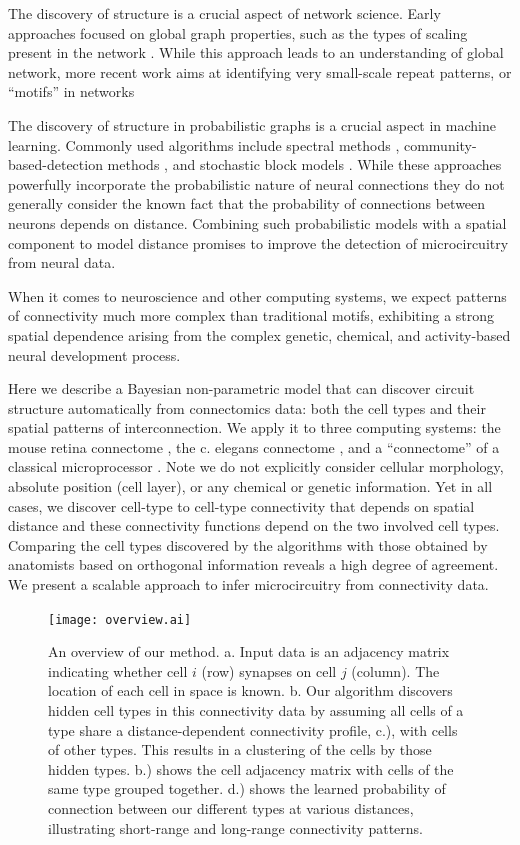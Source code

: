 \documentclass{article}
\begin{document}
The discovery of structure is a crucial aspect of network
science. Early approaches focused on global graph properties, such as
the types of scaling present in the network \autocite
{WattsStrogatz1998} .  While this approach leads to an understanding
of global network, more recent work aims at identifying very small-scale
repeat patterns, or “motifs” in networks\autocite{Milo2002}

The discovery of structure in probabilistic graphs is a crucial aspect
in machine learning. Commonly used algorithms include spectral methods
\autocite{},   community-based-detection   methods  \autocite{},   and
stochastic block  models \autocite{Nowicki2001}.  While these
approaches powerfully  incorporate the probabilistic nature of neural
connections \autocite{} they do not generally consider the known fact
that  the  probability  of  connections  between  neurons  depends  on
distance. Combining such probabilistic models with a spatial component
to model distance promises to  improve the detection of microcircuitry
from neural data.

When it comes to neuroscience and other computing systems, we expect
patterns of connectivity much more complex than traditional motifs,
exhibiting a strong spatial dependence arising from the complex
genetic, chemical, and activity-based neural development process. 


Here we describe a Bayesian non-parametric model that can discover
circuit structure automatically from connectomics data: both the cell
types and their spatial patterns of interconnection. We apply it to
three computing systems: the mouse retina connectome \autocite{}, the
c. elegans connectome \autocite{}, and a ``connectome'' of a classical
microprocessor \autocite{James2010}. Note we do not explicitly
consider cellular morphology, absolute position (cell layer), or any
chemical or genetic information. Yet in all cases, we discover
cell-type to cell-type connectivity that depends on spatial distance
and these connectivity functions depend on the two involved cell
types. Comparing the cell types discovered by the algorithms with
those obtained by anatomists based on orthogonal information reveals a
high degree of agreement. We present a scalable approach to infer
microcircuitry from connectivity data.

\begin{figure}
  \centering 
    \centerline{\texttt{[image: overview.ai]}}
  \caption{An overview of our method. a. Input data is
an adjacency matrix indicating whether cell $i$ (row)
synapses on cell $j$ (column). The location of each cell in space is known. 
b. Our algorithm discovers hidden cell types in this connectivity data
by assuming all cells of a type share a distance-dependent connectivity 
profile, c.), with cells of other types. This results in a clustering 
of the cells by those hidden types. b.) shows the cell adjacency
matrix with cells of the same type grouped together. d.) shows
the learned probability of connection between our different types
at various distances, illustrating short-range and long-range
connectivity patterns.}
\label{fig:overview}
\end{figure}
\end{document}
